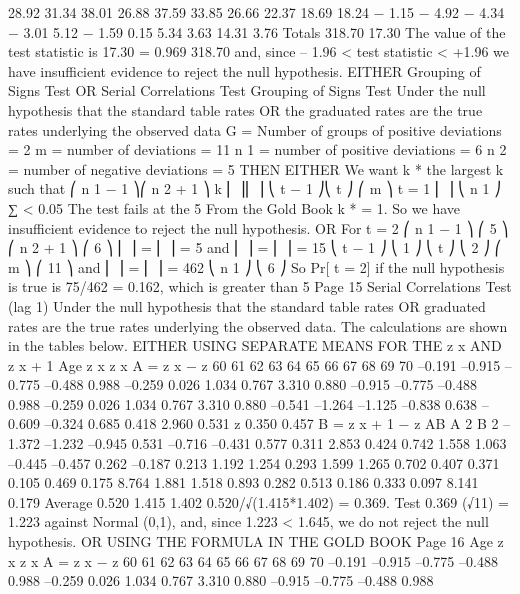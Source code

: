 \documentclass[a4paper,12pt]{article}
\begin{document}
\begin{enumerate}
28.92
31.34
38.01
26.88
37.59
33.85
26.66
22.37
18.69
18.24 − 1.15
− 4.92
− 4.34
− 3.01
5.12
− 1.59
0.15
5.34
3.63
14.31
3.76
Totals 318.70 17.30%
The value of the test statistic is
17.30
= 0.969
318.70
and, since – 1.96 < test statistic < +1.96 we have insufficient evidence to
reject the null hypothesis.
EITHER Grouping of Signs Test OR Serial Correlations Test
Grouping of Signs Test
Under the null hypothesis that the standard table rates OR the graduated rates
are the true rates underlying the observed data
G = Number of groups of positive deviations = 2
m = number of deviations = 11
n 1 = number of positive deviations = 6
n 2 = number of negative deviations = 5
THEN EITHER
We want k * the largest k such that
⎛ n 1 − 1 ⎞⎛ n 2 + 1 ⎞
k ⎜
⎟⎜
⎟
⎝ t − 1 ⎠⎝ t ⎠
⎛ m ⎞
t = 1
⎜ ⎟
⎝ n 1 ⎠
∑
< 0.05
The test fails at the 5%
From the Gold Book k * = 1.
So we have insufficient evidence to reject the null hypothesis.
OR
For t = 2
⎛ n 1 − 1 ⎞ ⎛ 5 ⎞
⎛ n 2 + 1 ⎞ ⎛ 6 ⎞
⎜
⎟ = ⎜ ⎟ = 5 and ⎜
⎟ = ⎜ ⎟ = 15
⎝ t − 1 ⎠ ⎝ 1 ⎠
⎝ t ⎠ ⎝ 2 ⎠
⎛ m ⎞ ⎛ 11 ⎞
and ⎜ ⎟ = ⎜ ⎟ = 462
⎝ n 1 ⎠ ⎝ 6 ⎠
So Pr[ t = 2] if the null hypothesis is true is 75/462 = 0.162, which is greater
than 5%
Page 15%
Serial Correlations Test (lag 1)
Under the null hypothesis that the standard table rates OR graduated
rates are the true rates underlying the observed data.
The calculations are shown in the tables below.
EITHER USING SEPARATE MEANS FOR THE z x AND z x + 1
Age z x z x A = z x − z
60
61
62
63
64
65
66
67
68
69
70 –0.191
–0.915
–0.775
–0.488
0.988
–0.259
0.026
1.034
0.767
3.310
0.880 –0.915
–0.775
–0.488
0.988
–0.259
0.026
1.034
0.767
3.310
0.880 –0.541
–1.264
–1.125
–0.838
0.638
–0.609
–0.324
0.685
0.418
2.960
0.531
z 0.350 0.457
B = z x + 1 − z
AB
A 2 B 2
–1.372
–1.232
–0.945
0.531
–0.716
–0.431
0.577
0.311
2.853
0.424 0.742
1.558
1.063
–0.445
–0.457
0.262
–0.187
0.213
1.192
1.254 0.293
1.599
1.265
0.702
0.407
0.371
0.105
0.469
0.175
8.764 1.881
1.518
0.893
0.282
0.513
0.186
0.333
0.097
8.141
0.179
Average 0.520 1.415 1.402
0.520/√(1.415*1.402) = 0.369.
Test 0.369 (√11) = 1.223 against Normal (0,1), and, since 1.223 < 1.645, we
do not reject the null hypothesis.
OR USING THE FORMULA IN THE GOLD BOOK
Page 16
Age z x z x A = z x − z
60
61
62
63
64
65
66
67
68
69
70 –0.191
–0.915
–0.775
–0.488
0.988
–0.259
0.026
1.034
0.767
3.310
0.880 –0.915
–0.775
–0.488
0.988

\end{enumerate}
\end{document}
